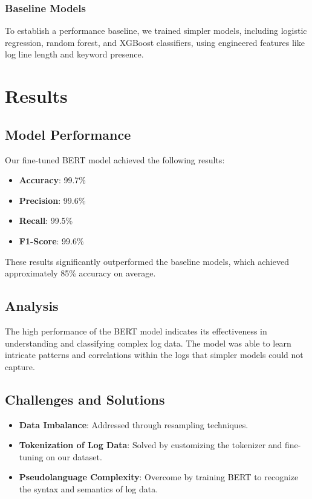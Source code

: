 \documentclass[12pt]{article}
\begin{document}
\subsubsection{Baseline Models}

To establish a performance baseline, we trained simpler models, including logistic regression, random forest, and XGBoost classifiers, using engineered features like log line length and keyword presence.

\section{Results}

\subsection{Model Performance}

Our fine-tuned BERT model achieved the following results:

\begin{itemize}
    \item \textbf{Accuracy}: 99.7\%
    \item \textbf{Precision}: 99.6\%
    \item \textbf{Recall}: 99.5\%
    \item \textbf{F1-Score}: 99.6\%
\end{itemize}

These results significantly outperformed the baseline models, which achieved approximately 85\% accuracy on average.

\subsection{Analysis}

The high performance of the BERT model indicates its effectiveness in understanding and classifying complex log data. The model was able to learn intricate patterns and correlations within the logs that simpler models could not capture.

\subsection{Challenges and Solutions}

\begin{itemize}
    \item \textbf{Data Imbalance}: Addressed through resampling techniques.
    \item \textbf{Tokenization of Log Data}: Solved by customizing the tokenizer and fine-tuning on our dataset.
    \item \textbf{Pseudolanguage Complexity}: Overcome by training BERT to recognize the syntax and semantics of log data.
\end{itemize}
\end{document}
